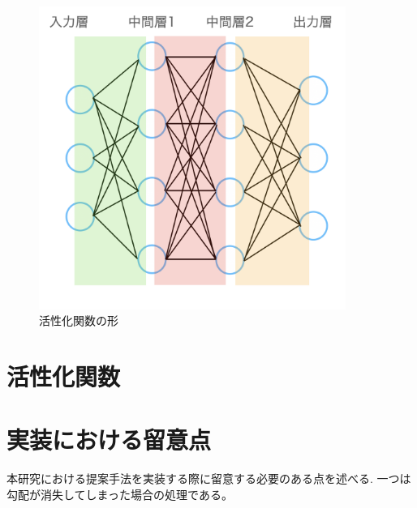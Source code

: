 \begin{figure}[hbtp]
    \begin{center}
        \includegraphics[width=10cm]{asset/neural_network1.png}
            \caption{活性化関数の形}
            \label{neural_network1}
    \end{center}
\end{figure}



\section{活性化関数}



\section{実装における留意点}
本研究における提案手法を実装する際に留意する必要のある点を述べる.
一つは勾配が消失してしまった場合の処理である。

\section{}

